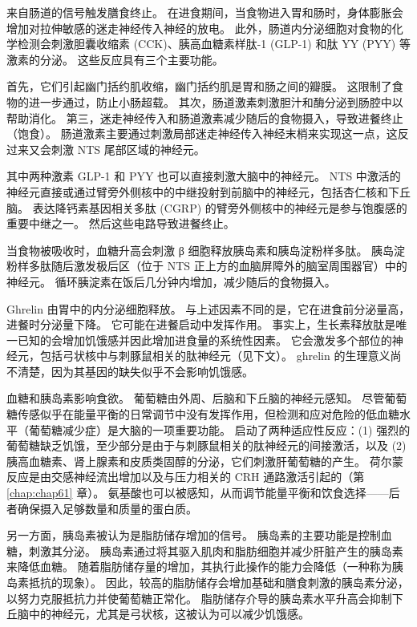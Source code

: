 \begin{figure}[htbp]
	\label{fig:41_14}
\end{figure}

来自肠道的信号触发膳食终止。 在进食期间，当食物进入胃和肠时，身体膨胀会增加对拉伸敏感的迷走神经传入神经的放电。 此外，肠道内分泌细胞对食物的化学检测会刺激胆囊收缩素 (CCK)、胰高血糖素样肽-1 (GLP-1) 和肽 YY (PYY) 等激素的分泌。 这些反应具有三个主要功能。

首先，它们引起幽门括约肌收缩，幽门括约肌是胃和肠之间的瓣膜。 这限制了食物的进一步通过，防止小肠超载。 其次，肠道激素刺激胆汁和酶分泌到肠腔中以帮助消化。 第三，迷走神经传入和肠道激素减少随后的食物摄入，导致进餐终止（饱食）。 肠道激素主要通过刺激局部迷走神经传入神经末梢来实现这一点，这反过来又会刺激 NTS 尾部区域的神经元。

其中两种激素 GLP-1 和 PYY 也可以直接刺激大脑中的神经元。 NTS 中激活的神经元直接或通过臂旁外侧核中的中继投射到前脑中的神经元，包括杏仁核和下丘脑。 表达降钙素基因相关多肽 (CGRP) 的臂旁外侧核中的神经元是参与饱腹感的重要中继之一。 然后这些电路导致进餐终止。

当食物被吸收时，血糖升高会刺激 β 细胞释放胰岛素和胰岛淀粉样多肽。 胰岛淀粉样多肽随后激发极后区（位于 NTS 正上方的血脑屏障外的脑室周围器官）中的神经元。 循环胰淀素在饭后几分钟内增加，减少随后的食物摄入。

Ghrelin 由胃中的内分泌细胞释放。 与上述因素不同的是，它在进食前分泌量高，进餐时分泌量下降。 它可能在进餐启动中发挥作用。 事实上，生长素释放肽是唯一已知的会增加饥饿感并因此增加进食量的系统性因素。 它会激发多个部位的神经元，包括弓状核中与刺豚鼠相关的肽神经元（见下文）。 ghrelin 的生理意义尚不清楚，因为其基因的缺失似乎不会影响饥饿感。

血糖和胰岛素影响食欲。 葡萄糖由外周、后脑和下丘脑的神经元感知。 尽管葡萄糖传感似乎在能量平衡的日常调节中没有发挥作用，但检测和应对危险的低血糖水平（葡萄糖减少症）是大脑的一项重要功能。 启动了两种适应性反应：(1) 强烈的葡萄糖缺乏饥饿，至少部分是由于与刺豚鼠相关的肽神经元的间接激活，以及 (2) 胰高血糖素、肾上腺素和皮质类固醇的分泌，它们刺激肝葡萄糖的产生。 荷尔蒙反应是由交感神经流出增加以及与压力相关的 CRH 通路激活引起的（第 \ref{chap:chap61} 章）。 氨基酸也可以被感知，从而调节能量平衡和饮食选择——后者确保摄入足够数量和质量的蛋白质。

另一方面，胰岛素被认为是脂肪储存增加的信号。 胰岛素的主要功能是控制血糖，刺激其分泌。 胰岛素通过将其驱入肌肉和脂肪细胞并减少肝脏产生的胰岛素来降低血糖。 随着脂肪储存量的增加，其执行此操作的能力会降低（一种称为胰岛素抵抗的现象）。 因此，较高的脂肪储存会增加基础和膳食刺激的胰岛素分泌，以努力克服抵抗力并使葡萄糖正常化。 脂肪储存介导的胰岛素水平升高会抑制下丘脑中的神经元，尤其是弓状核，这被认为可以减少饥饿感。

